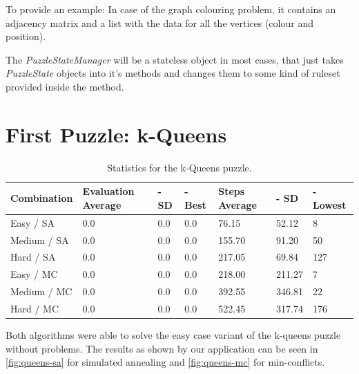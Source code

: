 \documentclass{scrartcl}
\begin{document}
To provide an example: In case of the graph colouring problem, it contains an adjacency matrix and a list with the data for all the vertices (colour and position).

The \textit{PuzzleStateManager} will be a stateless object in most cases, that just takes \textit{PuzzleState} objects into it's methods and changes them to some kind of ruleset provided inside the method.

\section{First Puzzle: k-Queens}

\begin{table}[!htbp]
\caption{Statistics for the k-Queens puzzle.}
\begin{tabularx}{\textwidth}{l | X | X | X | X | X | X}
Combination & Evaluation  \newline Average & - \newline SD & - \newline Best & Steps \newline Average & - \newline SD & - \newline Lowest \\
\hline
Easy / SA & 0.0 & 0.0 & 0.0 & 76.15 & 52.12 & 8 \\
Medium / SA & 0.0 & 0.0 & 0.0 & 155.70 & 91.20 & 50  \\
Hard / SA & 0.0 & 0.0 & 0.0 & 217.05 & 69.84 & 127  \\
Easy / MC & 0.0 & 0.0 & 0.0 & 218.00 & 211.27 & 7  \\
Medium / MC & 0.0 & 0.0 & 0.0 & 392.55 & 346.81 & 22  \\
Hard / MC & 0.0 & 0.0 & 0.0 & 522.45 & 317.74 & 176  \\
\end{tabularx}
\end{table}

Both algorithms were able to solve the easy case variant of the k-queens puzzle without problems.
The results as shown by our application can be seen in \autoref{fig:queens-sa} for simulated annealing and \autoref{fig:queens-mc} for min-conflicts.
\end{document}

